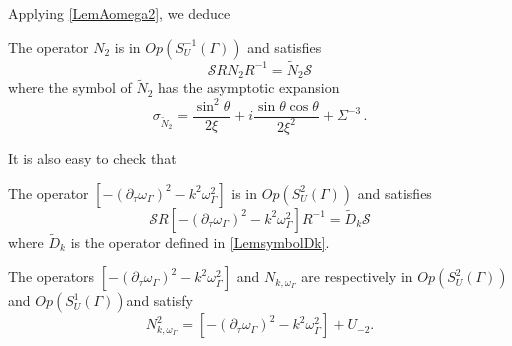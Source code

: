 \documentclass[a4paper]{article}
\begin{document}
\noindent Applying \autoref{LemAomega2}, we deduce
\begin{Cor}
	The operator $N_2$ is in $\textit{Op}(S^{-1}_U(\Gamma))$ and satisfies
	\[\mathcal{S} RN_2R^{-1} = \tilde{N}_2 \mathcal{S}\]
	where the symbol of $\tilde{N}_2$ has the asymptotic expansion
	\begin{equation}
		\sigma_{\tilde{N}_2} = \frac{\sin^2\theta}{2\xi} + i\frac{\sin\theta \cos \theta}{2 \xi^2} + \Sigma^{-3}\,.
		\label{symboleN2}
	\end{equation}
\end{Cor}
\noindent It is also easy to check that
\begin{Lem}
	\label{LemsymbolDkBis}
	The operator $\left[-(\partial_\tau \omega_\Gamma )^2 - k^2\omega_\Gamma^2\right]$ is in $\textit{Op}(S_U^2(\Gamma))$ and satisfies 
	\[\mathcal{S} R\left[-(\partial_\tau \omega_\Gamma )^2 - k^2\omega_\Gamma^2\right]R^{-1}  = \tilde{D}_k \mathcal{S}\]
	where $\tilde{D}_k$ is the operator defined in \autoref{LemsymbolDk}.
\end{Lem}
\begin{The}
	\label{TheNkomega}
	The operators $\left[-(\partial_\tau \omega_\Gamma )^2 - k^2\omega_\Gamma^2\right]$ and  $N_{k,\omega_\Gamma}$ are respectively in $\textit{Op}(S^{2}_U(\Gamma))$ and $\textit{Op}(S^{1}_U(\Gamma))$and satisfy
	\[N_{k,\omega_\Gamma}^2 = \left[-(\partial_\tau \omega_\Gamma)^2 - k^2 \omega_\Gamma^2\right] + U_{-2}. \]
\end{The}
\end{document}

